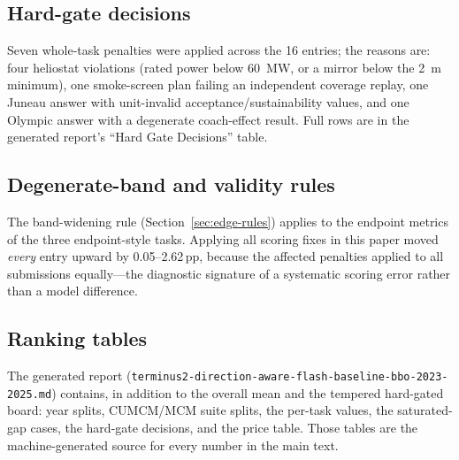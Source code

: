 \subsection{Hard-gate decisions}
Seven whole-task penalties were applied across the 16 entries; the reasons are:
four heliostat violations (rated power below 60~MW, or a mirror below the 2~m
minimum), one smoke-screen plan failing an independent coverage replay, one
Juneau answer with unit-invalid acceptance/sustainability values, and one Olympic
answer with a degenerate coach-effect result. Full rows are in the generated
report's ``Hard Gate Decisions'' table.

\subsection{Degenerate-band and validity rules}
The band-widening rule (Section~\ref{sec:edge-rules}) applies to the endpoint
metrics of the three endpoint-style tasks. Applying all scoring fixes in this
paper moved \emph{every} entry upward by 0.05--2.62\,pp, because the affected
penalties applied to all submissions equally---the diagnostic signature of a
systematic scoring error rather than a model difference.

\subsection{Ranking tables}
The generated report
(\texttt{terminus2-direction-aware-flash-baseline-bbo-2023-2025.md}) contains, in
addition to the overall mean and the tempered hard-gated board: year splits,
CUMCM/MCM suite splits, the per-task values, the saturated-gap cases, the hard-gate
decisions, and the price table. Those tables are the machine-generated source for
every number in the main text.
